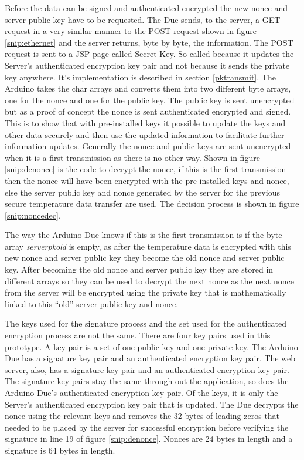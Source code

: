 Before the data can be signed and authenticated encrypted the new nonce and server public key have to be requested. The Due sends, to the server, a GET request in a very similar manner to the POST request shown in figure \ref{snip:ethernet} and the server returns, byte by byte, the information. The POST request is sent to a JSP page called Secret Key. So called because it updates the Server's authenticated encryption key pair and not because it sends the private key anywhere. It's implementation is described in section \ref{pktransmit}. The Arduino takes the char arrays and converts them into two different byte arrays, one for the nonce and one for the public key. The public key is sent unencrypted but as a proof of concept the nonce is sent authenticated encrypted and signed. This is to show that with pre-installed keys it possible to update the keys and other data securely and then use the updated information to facilitate further information updates. Generally the nonce and public keys are sent unencrypted when it is a first transmission as there is no other way. Shown in figure \ref{snip:denonce} is the code to decrypt the nonce, if this is the first transmission then the nonce will have been encrypted with the pre-installed keys and nonce, else the server public key and nonce generated by the server for the previous secure temperature data transfer are used. The decision process is shown in figure \ref{snip:noncedec}. 

The way the Arduino Due knows if this is the first transmission is if the byte array \emph{serverpkold} is empty, as after the temperature data is encrypted with this new nonce and server public key they become the old nonce and server public key. After becoming the old nonce and server public key they are stored in different arrays so they can be used to decrypt the next nonce as the next nonce from the server will be encrypted using the private key that is mathematically linked to this ``old'' server public key and nonce.

  The keys used for the signature process and the set used for the authenticated encryption process are not the same. There are four key pairs used in this prototype. A key pair is a set of one public key and one private key. The Arduino Due has a signature key pair and an authenticated encryption key pair. The web server, also, has a signature key pair and an authenticated encryption key pair. The signature key pairs stay the same through out the application, so does the Arduino Due's authenticated encryption key pair. Of the keys, it is only the Server's authenticated encryption key pair that is updated.
The Due decrypts the nonce using the relevant keys and removes the 32 bytes of leading zeros that needed to be placed by the server for successful encryption before verifying the signature in line 19 of figure \ref{snip:denonce}. Nonces are 24 bytes in length and a signature is 64 bytes in length.

